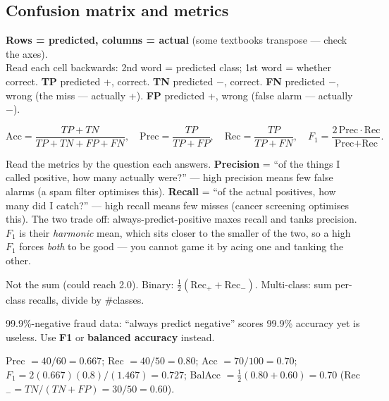 \documentclass[11pt, a4paper]{article}
\newcommand{\kw}[1]{\textbf{#1}}
\begin{document}
\subsection{Confusion matrix and metrics}

\begin{defbox}
\kw{Rows = predicted, columns = actual} (some textbooks transpose — check the axes). \\
Read each cell backwards: 2nd word = predicted class; 1st word = whether correct.
\kw{TP} predicted +, correct. \kw{TN} predicted $-$, correct. \kw{FN} predicted $-$, wrong (the
miss — actually +). \kw{FP} predicted +, wrong (false alarm — actually $-$).
\end{defbox}

\[
\text{Acc}=\frac{TP+TN}{TP+TN+FP+FN},\quad
\text{Prec}=\frac{TP}{TP+FP},\quad
\text{Rec}=\frac{TP}{TP+FN},\quad
F_1=\frac{2\,\text{Prec}\cdot\text{Rec}}{\text{Prec}+\text{Rec}}.
\]

Read the metrics by the question each answers. \kw{Precision} = ``of the things I called positive,
how many actually were?'' — high precision means few false alarms (a spam filter optimises this).
\kw{Recall} = ``of the actual positives, how many did I catch?'' — high recall means few misses
(cancer screening optimises this). The two trade off: always-predict-positive maxes recall and tanks
precision. \kw{$F_1$} is their \emph{harmonic} mean, which sits closer to the smaller of the two, so
a high $F_1$ forces \emph{both} to be good — you cannot game it by acing one and tanking the other.

\begin{trapbox}[balanced accuracy = \emph{mean} of recalls]
Not the sum (could reach 2.0). Binary: $\tfrac12(\text{Rec}_++\text{Rec}_-)$. Multi-class: sum
per-class recalls, divide by \#classes.
\end{trapbox}

\begin{pitfallbox}
99.9\%-negative fraud data: ``always predict negative'' scores 99.9\% accuracy yet is useless. Use
\kw{F1} or \kw{balanced accuracy} instead.
\end{pitfallbox}

\begin{exambox}[Q5-style — compute metrics from $TP{=}40,\ FN{=}10,\ FP{=}20,\ TN{=}30$]
Prec $=40/60=0.667$; Rec $=40/50=0.80$; Acc $=70/100=0.70$;
$F_1=2(0.667)(0.8)/(1.467)=0.727$; BalAcc $=\tfrac12(0.80+0.60)=0.70$
(Rec$_-=TN/(TN+FP)=30/50=0.60$).
\end{exambox}
\end{document}
